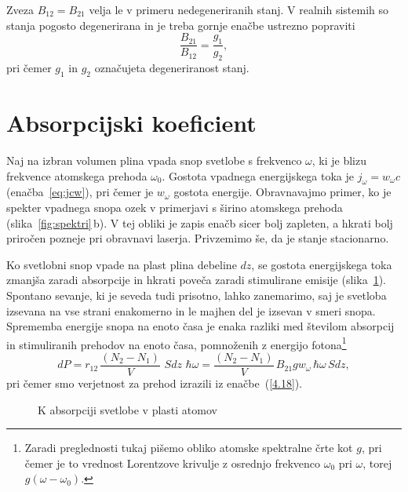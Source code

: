 \begin{remark}
 Zveza $B_{12}=B_{21}$ velja le v primeru nedegeneriranih stanj. V realnih sistemih
 so stanja pogosto degenerirana in je treba gornje enačbe ustrezno popraviti
\begin{equation}
\frac{B_{21}}{B_{12}} = \frac{g_1}{g_2},
\label{eq:ABdeg}
\end{equation}
pri čemer $g_{1}$ in $g_2$ označujeta degeneriranost stanj. 
\end{remark}

\section{Absorpcijski koeficient}
Naj na izbran volumen plina vpada snop svetlobe s frekvenco
$\omega$, ki je blizu frekvence atomskega prehoda $\omega_{0}$. Gostota
vpadnega energijskega toka je $j_{\omega}=w_{\omega}c$ (enačba~\ref{eq:jcw}), 
pri čemer je $w_{\omega}$ gostota energije. Obravnavajmo primer, ko je 
spekter vpadnega snopa ozek v primerjavi s širino atomskega prehoda
(slika~\ref{fig:spektri}\,b). V tej obliki je zapis enačb sicer bolj zapleten,
a hkrati bolj priročen pozneje pri obravnavi laserja. Privzemimo še, da
je stanje stacionarno. 

Ko svetlobni snop vpade na plast plina debeline $dz$, se gostota
energijskega toka zmanjša zaradi absorpcije in hkrati poveča zaradi 
stimulirane emisije (slika~\ref{fig:abs}). 
Spontano sevanje, ki je seveda tudi prisotno, lahko zanemarimo, saj
je svetloba izsevana na vse strani enakomerno in le majhen del je izsevan v smeri snopa.
Sprememba energije snopa na enoto časa je enaka razliki med 
številom absorpcij in stimuliranih prehodov na enoto časa, pomnoženih z 
energijo fotona\footnote{Zaradi preglednosti tukaj pišemo obliko atomske spektralne črte kot $g$, 
pri čemer je to vrednost Lorentzove krivulje z osrednjo frekvenco $\omega_0$ pri $\omega$, 
torej $g(\omega-\omega_0)$.}
\begin{equation}
dP=r_{12}\,\frac{(N_{2}-N_{1})}{V}\,\,S dz\, \, \hbar\omega = 
\frac{(N_{2}-N_{1})}{V}\,B_{21}g w_{\omega} \, \hbar\omega \,S dz,
\label{4.28}
\end{equation}
pri čemer smo verjetnost za prehod izrazili iz 
enačbe~(\ref{4.18}).
\begin{figure}[h]
\centering
\def\svgwidth{70truemm} 

\caption{K absorpciji svetlobe v plasti atomov}
\label{fig:abs}
\end{figure}

